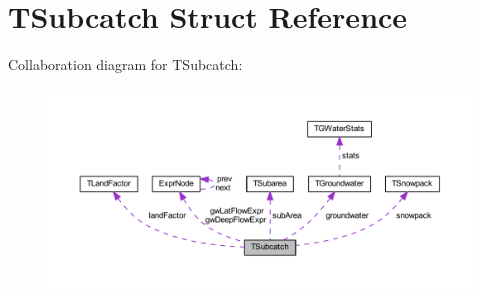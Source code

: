 \hypertarget{struct_t_subcatch}{}\section{T\+Subcatch Struct Reference}
\label{struct_t_subcatch}


Collaboration diagram for T\+Subcatch\+:
\nopagebreak
\begin{figure}[H]
\begin{center}
\leavevmode
\includegraphics[width=350pt]{dd/db4/struct_t_subcatch__coll__graph}
\end{center}
\end{figure}
